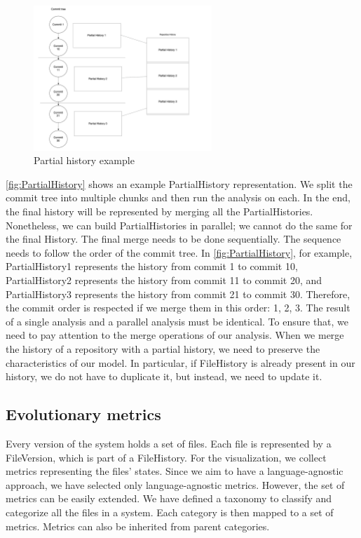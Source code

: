\begin{figure}
    \begin{center}
        \includegraphics[width=0.6\textwidth]{PartialHistory.png}
    \end{center}
    \caption{Partial history example}
    \label{fig:PartialHistory}
\end{figure}

\autoref{fig:PartialHistory} shows an example PartialHistory representation. 
We split the commit tree into multiple chunks and then run the analysis on each. 
In the end, the final history will be represented by merging all the PartialHistories. 
Nonetheless, we can build PartialHistories in parallel; we cannot do the same for the final History. 
The final merge needs to be done sequentially. The sequence needs to follow the order of the commit tree. 
In \autoref{fig:PartialHistory}, for example,
PartialHistory1 represents the history from commit 1 to commit 10, 
PartialHistory2 represents the history from commit 11 to commit 20, and 
PartialHistory3 represents the history from commit 21 to commit 30.
Therefore, the commit order is respected if we merge them in this order: 1, 2, 3. 
The result of a single analysis and a parallel analysis must be identical. 
To ensure that, we need to pay attention to the merge operations of our analysis.
When we merge the history of a repository with a partial history, we need to preserve the characteristics of our model. 
In particular, if FileHistory is already present in our history, we do not have to duplicate it, but instead, we need to update it. 
\label{s:evolutionaryMetrics}
\subsection*{Evolutionary metrics}
Every version of the system holds a set of files. 
Each file is represented by a FileVersion, which is part of a FileHistory.
For the visualization, we collect metrics representing the files' states.
Since we aim to have a language-agnostic approach, we have selected only language-agnostic metrics. 
However, the set of metrics can be easily extended.
We have defined a taxonomy to classify and categorize all the files in a system. 
Each category is then mapped to a set of metrics. Metrics can also be inherited from parent categories. 

